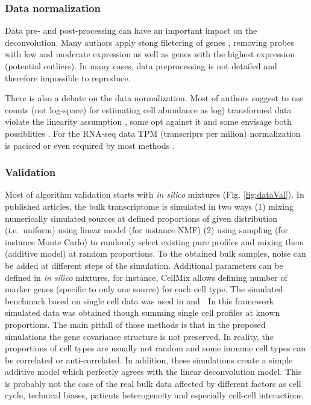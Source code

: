 \documentclass[12pt,]{book}
\theoremstyle{definition}
\theoremstyle{definition}
\theoremstyle{definition}
\theoremstyle{remark}
\begin{document}
\hypertarget{data-normalization}{%
\subsubsection{Data normalization}\label{data-normalization}}

Data pre- and post-processing can have an important impact on the
deconvolution. Many authors apply stong filetering of genes
\citep{Wang2016}, removing probes with low and moderate expression as
well as genes with the highest expression (potential outliers). In many
cases, data preprocessing is not detailed and therefore impossible to
reproduce.

There is also a debate on the data normalization. Most of authors
suggest to use counts (not log-space) for estimating cell abundance as
log) transformed data violate the linearity assumption
\citep{Zhong2013}, some opt against it \citep{Shannon2017, Clarke2010}
and some envisage both possiblities \citep{Erkkila2010, Repsilber2010}.
For the RNA-seq data TPM (transcriprs per milion) normalization is
paciced or even required by most methods
\citep{Chen2018, Finotello2017, Racle2017}.

\hypertarget{Validation}{%
\subsubsection{Validation}\label{Validation}}

Most of algorithm validation starts with \emph{in silico} mixtures (Fig.
\ref{fig:dataVal}). In published articles, the bulk transcriptome is
simulated in two ways (1) mixing numerically simulated sources at
defined proportions of given distribution (i.e.~uniform) using linear
model (for instance NMF) (2) using sampling (for instance Monte Carlo)
to randomly select existing pure profiles and mixing them (additive
model) at random proportions. To the obtained bulk samples, noise can be
added at different steps of the simulation. Additional parameters can be
defined in \emph{in silico} mixtures, for instance, CellMix allows
defining number of marker genes (specific to only one source) for each
cell type. The simulated benchmark based on single cell data was used in
\citet{Schelker2017} and \citet{Gortler2018}. In this framework
simulated data was obtained though summing single cell profiles at known
proportions. The main pitfall of those methods is that in the proposed
simulations the gene covariance structure is not preserved. In reality,
the proportions of cell types are usually not random and some immune
cell types can be correlated or anti-correlated. In addition, these
simulations create a simple additive model which perfectly agrees with
the linear deconvolution model. This is probably not the case of the
real bulk data affected by different factors as cell cycle, technical
biases, patients heterogeneity and especially cell-cell interactions.
\end{document}
